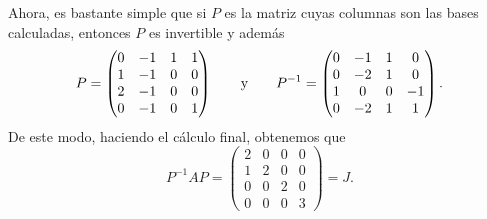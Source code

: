 \begin{example}
  Ahora, es bastante simple que si $P$ es la matriz cuyas columnas son las bases calculadas, entonces $P$ es invertible y además
  \[
    P = \begin{pmatrix}
      0 & -1 & 1 & 1 \\
      1 & -1 & 0 & 0 \\
      2 & -1 & 0 & 0 \\
      0 & -1 & 0 & 1 
    \end{pmatrix}
    \qquad\text{y}\qquad
    P^{-1} = \begin{pmatrix} 0 & -1 & 1 & 0 \\ 0 & -2 & 1 & 0 \\ 1 & 0 & 0 & -1 \\ 0 & -2 & 1 & 1 \end{pmatrix}.
  \]
  De este modo, haciendo el cálculo final, obtenemos que
  \[
    P^{-1}AP = \begin{pmatrix} 2 & 0 & 0 & 0 \\ 1 & 2 & 0 & 0 \\ 0 & 0 & 2 & 0 \\ 0 & 0 & 0 & 3 \end{pmatrix} = J.
  \]
\end{example}

